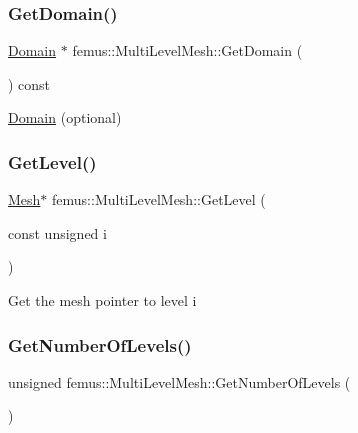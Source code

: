 \subsubsection{\texorpdfstring{Get\+Domain()}{GetDomain()}}
{\footnotesize\ttfamily \mbox{\hyperlink{classfemus_1_1_domain}{Domain}} $\ast$ femus\+::\+Multi\+Level\+Mesh\+::\+Get\+Domain (\begin{DoxyParamCaption}{ }\end{DoxyParamCaption}) const}

\mbox{\hyperlink{classfemus_1_1_domain}{Domain}} (optional) \mbox{\label{classfemus_1_1_multi_level_mesh_ae5e4557f7784330822b988d83e2b6a40}} 
\subsubsection{\texorpdfstring{Get\+Level()}{GetLevel()}}
{\footnotesize\ttfamily \mbox{\hyperlink{classfemus_1_1_mesh}{Mesh}}$\ast$ femus\+::\+Multi\+Level\+Mesh\+::\+Get\+Level (\begin{DoxyParamCaption}\item[{const unsigned}]{i }\end{DoxyParamCaption})\hspace{0.3cm}{\ttfamily [inline]}}

Get the mesh pointer to level i \mbox{\label{classfemus_1_1_multi_level_mesh_a89a77678df230dce7f2dd2ff171c71b4}} 
\subsubsection{\texorpdfstring{Get\+Number\+Of\+Levels()}{GetNumberOfLevels()}}
{\footnotesize\ttfamily unsigned femus\+::\+Multi\+Level\+Mesh\+::\+Get\+Number\+Of\+Levels (\begin{DoxyParamCaption}{ }\end{DoxyParamCaption})\hspace{0.3cm}{\ttfamily [inline]}}

